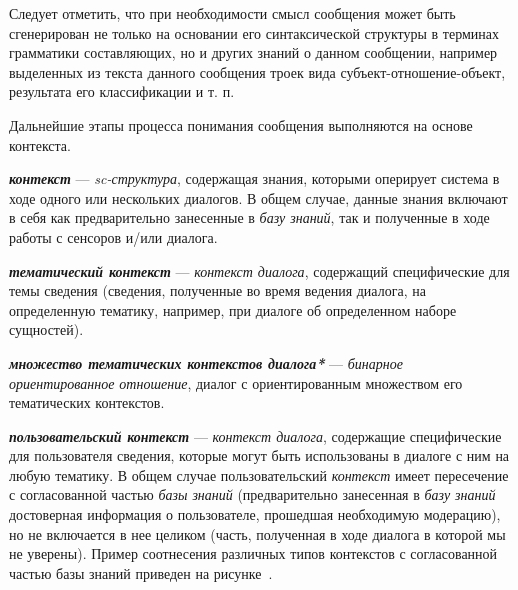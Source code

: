 Следует отметить, что при необходимости смысл сообщения может быть сгенерирован не только на основании его синтаксической структуры в терминах грамматики составляющих, но и других знаний о данном сообщении, например выделенных из текста данного сообщения троек вида субъект-отношение-объект, результата его классификации и т. п.

Дальнейшие этапы процесса понимания сообщения выполняются на основе контекста.

\textbf{\textit{контекст}} --- \textit{sc-структура}, содержащая знания, которыми оперирует система в ходе одного или нескольких диалогов.
В общем случае, данные знания включают в себя как предварительно занесенные в \textit{базу знаний}, так и полученные в ходе работы с сенсоров и/или диалога.

\begin{SCn}

    \begin{scnindent}
        \begin{scneqtoset}
        \end{scneqtoset}
    \end{scnindent}

\end{SCn}

\textbf{\textit{тематический контекст}} --- \textit{контекст диалога}, содержащий специфические для темы сведения (сведения, полученные во время ведения диалога, на определенную тематику, например, при диалоге об определенном наборе сущностей).

\textbf{\textit{множество тематических контекстов диалога*}} --- \textit{бинарное ориентированное отношение}, диалог с ориентированным множеством его тематических контекстов.

\textbf{\textit{пользовательский контекст}} --- \textit{контекст диалога}, содержащие специфические для пользователя сведения, которые могут быть использованы в диалоге с ним на любую тематику.
В общем случае пользовательский \textit{контекст} имеет пересечение с согласованной частью \textit{базы знаний} (предварительно занесенная в \textit{базу знаний} достоверная информация о пользователе, прошедшая необходимую модерацию), но не включается в нее целиком (часть, полученная в ходе диалога в которой мы не уверены).
Пример соотнесения различных типов контекстов с согласованной частью базы знаний приведен на рисунке~\textit{}.

